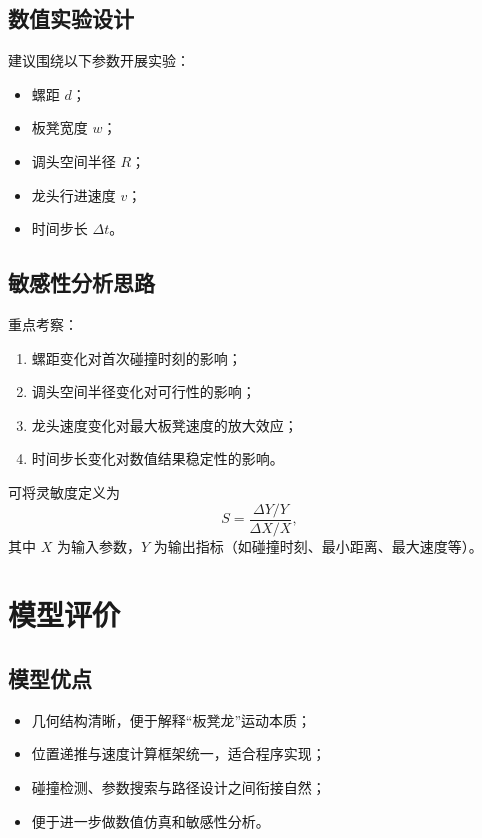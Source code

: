 \documentclass[12pt,a4paper]{ctexart}
\begin{document}
\subsection{数值实验设计}
建议围绕以下参数开展实验：
\begin{itemize}[leftmargin=2em]
    \item 螺距 $d$；
    \item 板凳宽度 $w$；
    \item 调头空间半径 $R$；
    \item 龙头行进速度 $v$；
    \item 时间步长 $\Delta t$。
\end{itemize}

\subsection{敏感性分析思路}
重点考察：
\begin{enumerate}[leftmargin=2em]
    \item 螺距变化对首次碰撞时刻的影响；
    \item 调头空间半径变化对可行性的影响；
    \item 龙头速度变化对最大板凳速度的放大效应；
    \item 时间步长变化对数值结果稳定性的影响。
\end{enumerate}

可将灵敏度定义为
\begin{equation}
S=\frac{\Delta Y / Y}{\Delta X / X},
\end{equation}
其中 $X$ 为输入参数，$Y$ 为输出指标（如碰撞时刻、最小距离、最大速度等）。

\section{模型评价}

\subsection{模型优点}
\begin{itemize}[leftmargin=2em]
    \item 几何结构清晰，便于解释“板凳龙”运动本质；
    \item 位置递推与速度计算框架统一，适合程序实现；
    \item 碰撞检测、参数搜索与路径设计之间衔接自然；
    \item 便于进一步做数值仿真和敏感性分析。
\end{itemize}
\end{document}

